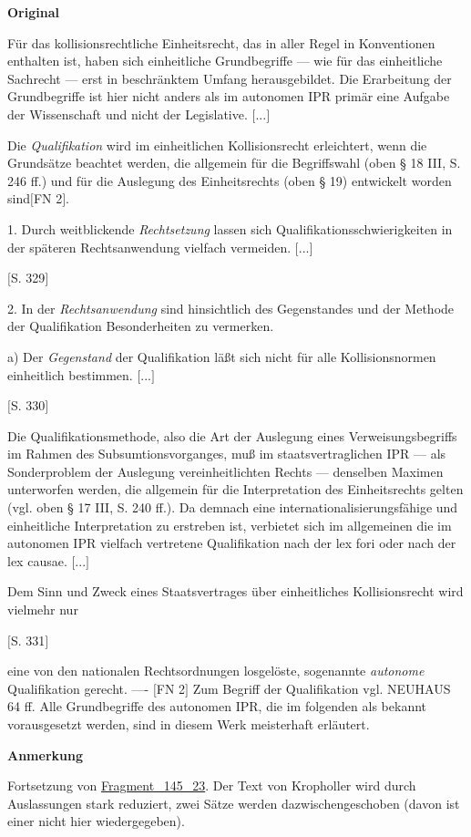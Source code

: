 \documentclass[ngerman,final,fontsize=12pt,paper=a4,twoside,bibliography=totocnumbered,BCOR=8mm,draft=false]{scrartcl}
\newenvironment{fragment}
	{\begin{snugshade}}
	{\end{snugshade}
	 \penalty-200
	 \vskip 0pt plus 10mm minus 5mm}
\newenvironment{fragmentpart}[1]
	{\noindent\textbf{#1}\par\penalty500}
	{\par}
\begin{document}
\begin{fragment}
\begin{fragmentpart}{Original \cite[S.~328--331 Z.~3--7,~20--25,~30--33,~18--25,~31--32,~1--2]{Kropholler-1975}}
{Für das kollisionsrechtliche Einheitsrecht, das in aller Regel in Konventionen
enthalten ist, haben sich einheitliche Grundbegriffe — wie für das
einheitliche Sachrecht --- erst in beschränktem Umfang herausgebildet. Die Erarbeitung der Grundbegriffe ist hier nicht anders als im autonomen IPR primär eine Aufgabe der Wissenschaft und nicht der Legislative. $[$...$]$

Die \textsl{Qualifikation} wird im einheitlichen Kollisionsrecht erleichtert, wenn die Grundsätze beachtet werden, die allgemein für die Begriffswahl (oben § 18 III, S. 246 ff.) und für die Auslegung des Einheitsrechts (oben § 19) entwickelt worden sind$[$FN 2$]$.

1. Durch weitblickende \textsl{Rechtsetzung} lassen sich Qualifikationsschwierigkeiten
in der späteren Rechtsanwendung vielfach vermeiden. $[$...$]$

$[$S. 329$]$

2. In der \textsl{Rechtsanwendung} sind hinsichtlich des Gegenstandes und der Methode der Qualifikation Besonderheiten zu vermerken.

a) Der \textsl{Gegenstand} der Qualifikation läßt sich nicht für alle Kollisionsnormen
einheitlich bestimmen. $[$...$]$

$[$S. 330$]$

Die Qualifikationsmethode, also die Art der Auslegung eines Verweisungsbegriffs im Rahmen des Subsumtionsvorganges, muß im staatsvertraglichen IPR --- als Sonderproblem der Auslegung vereinheitlichten Rechts --- denselben Maximen unterworfen werden, die allgemein für die Interpretation des Einheitsrechts gelten (vgl. oben § 17 III, S. 240 ff.). Da demnach eine internationalisierungsfähige und einheitliche Interpretation zu erstreben ist, verbietet sich im allgemeinen die im autonomen IPR vielfach vertretene Qualifikation nach der lex fori oder nach der lex causae. $[$...$]$

Dem Sinn und Zweck eines Staatsvertrages über einheitliches Kollisionsrecht wird vielmehr nur

$[$S. 331$]$

eine von den nationalen Rechtsordnungen losgelöste, sogenannte \textsl{autonome} Qualifikation gerecht.
----
$[$FN 2$]$ Zum Begriff der Qualifikation vgl. NEUHAUS 64 ff. Alle Grundbegriffe des autonomen IPR, die im folgenden als bekannt vorausgesetzt werden, sind in diesem Werk meisterhaft erläutert.}
\end{fragmentpart}
\begin{fragmentpart}{Anmerkung}
Fortsetzung von \hyperlink{Lm-Fragment-145-23}{Fragment\_145\_23}. Der Text von Kropholler wird durch Auslassungen stark reduziert, zwei Sätze werden dazwischengeschoben (davon ist einer nicht hier wiedergegeben).
\end{fragmentpart}
\end{fragment}
\end{document}
